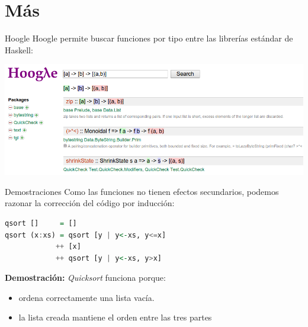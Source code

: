 \section{Más}

\begin{frame}[fragile]{Hoogle}
  Hoogle permite buscar funciones por tipo entre las librerías
  estándar de Haskell:

  \begin{center}
  \includegraphics[scale=0.35]{./images/hoogle.png}
  \end{center}
\end{frame}


\begin{frame}[fragile]{Demostraciones}
  Como las funciones no tienen efectos secundarios, podemos razonar la
  corrección del código por inducción:

  \begin{lstlisting}[language=haskell]
qsort []     = []
qsort (x:xs) = qsort [y | y<-xs, y<=x]
            ++ [x]
            ++ qsort [y | y<-xs, y>x]
  \end{lstlisting}

  \espacio
  
  \textbf{Demostración:} \textit{Quicksort} funciona porque:
  \begin{itemize}
   \item ordena correctamente una lista vacía.
   \item la lista creada mantiene el orden entre las tres partes
  \end{itemize}
\end{frame}


